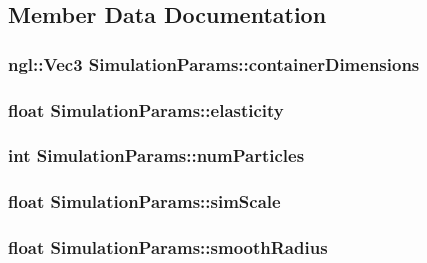 \subsection{Member Data Documentation}
\hypertarget{structSimulationParams_af5b2cb0226305f4a50c3e4a0ebeef69d}{
\subsubsection[{containerDimensions}]{\setlength{\rightskip}{0pt plus 5cm}ngl::Vec3 {\bf SimulationParams::containerDimensions}}}
\label{structSimulationParams_af5b2cb0226305f4a50c3e4a0ebeef69d}
\hypertarget{structSimulationParams_a4621af935ec0adef1c2123e4078b4048}{
\subsubsection[{elasticity}]{\setlength{\rightskip}{0pt plus 5cm}float {\bf SimulationParams::elasticity}}}
\label{structSimulationParams_a4621af935ec0adef1c2123e4078b4048}
\hypertarget{structSimulationParams_a55b286cb7f79ff33f9f43e02e32eead4}{
\subsubsection[{numParticles}]{\setlength{\rightskip}{0pt plus 5cm}int {\bf SimulationParams::numParticles}}}
\label{structSimulationParams_a55b286cb7f79ff33f9f43e02e32eead4}
\hypertarget{structSimulationParams_a9f81f70970bf2b1437bf6b5d7e605bd2}{
\subsubsection[{simScale}]{\setlength{\rightskip}{0pt plus 5cm}float {\bf SimulationParams::simScale}}}
\label{structSimulationParams_a9f81f70970bf2b1437bf6b5d7e605bd2}
\hypertarget{structSimulationParams_a2516973b9fe3e512b3be4c85c821d86c}{
\subsubsection[{smoothRadius}]{\setlength{\rightskip}{0pt plus 5cm}float {\bf SimulationParams::smoothRadius}}}
